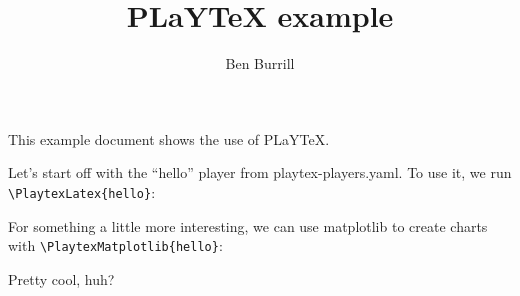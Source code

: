 \documentclass{article}
\title{PLaYTeX example}
\author{Ben Burrill}
\date{}
\begin{document}
    \maketitle

    This example document shows the use of PLaYTeX.

    Let's start off with the ``hello'' player from playtex-players.yaml.
    To use it, we run \verb|\PlaytexLatex{hello}|: 


    For something a little more interesting, we can use matplotlib to
    create charts with \verb|\PlaytexMatplotlib{hello}|:


    Pretty cool, huh?
\end{document}
